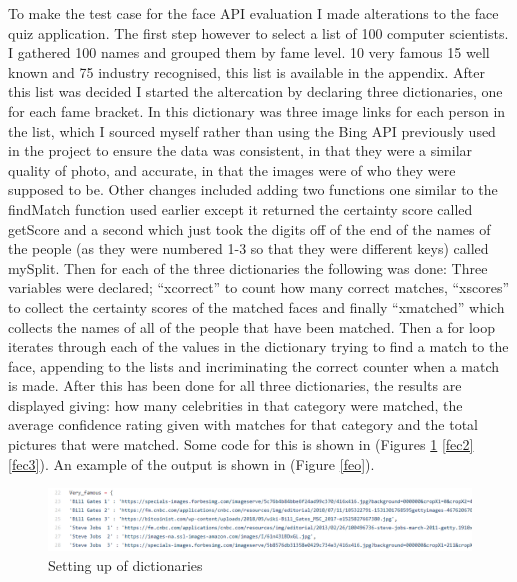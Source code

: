 \documentclass[12pt,a4paper]{article}
\begin{document}
To make the test case for the face API evaluation I made alterations to the face quiz application. The first step however to select a list of 100 computer scientists. I gathered 100 names and grouped them by fame level. 10 very famous 15 well known and 75 industry recognised, this list is available in the appendix. After this list was decided I started the altercation by declaring three dictionaries, one for each fame bracket. In this dictionary was three image links for each person in the list, which I sourced myself rather than using the Bing API previously used in the project to ensure the data was consistent, in that they were a similar quality of photo, and accurate, in that the images were of who they were supposed to be. Other changes included adding two functions one similar to the findMatch function used earlier except it returned the certainty score called getScore and a second which just took the digits off of the end of the names of the people (as they were numbered 1-3 so that they were different keys) called mySplit. Then for each of the three dictionaries the following was done: Three variables were declared; “xcorrect” to count how many correct matches, “xscores” to collect the certainty scores of the matched faces and finally “xmatched” which collects the names of all of the people that have been matched. Then a for loop iterates through each of the values in the dictionary trying to find a match to the face, appending to the lists and incriminating the correct counter when a match is made.  After this has been done for all three dictionaries, the results are displayed giving: how many celebrities in that category were matched, the average confidence rating given with matches for that category and the total pictures that were matched.  Some code for this is shown in (Figures \ref{fec1} \ref{fec2} \ref{fec3}).  An example of the output is shown in (Figure \ref{feo}).   

\begin{figure}[h]
    \centering
    \includegraphics[width=1.0\textwidth]{Figs/faceevalcode1.PNG} 
    \caption{Setting up of dictionaries} 
    \label{fec1}
\end{figure} 
\end{document}
